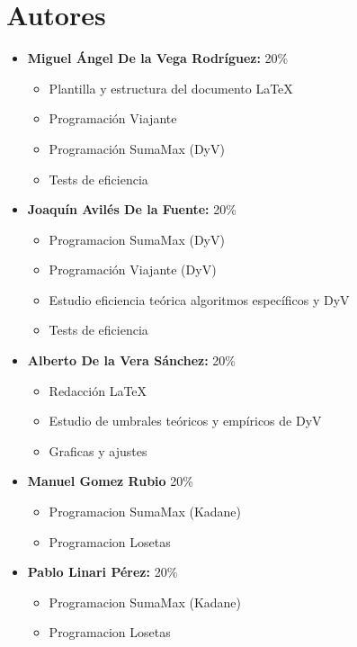 \documentclass[11pt,openany]{book}
\begin{document}
\tableofcontents %
\newpage %


\chapter{Autores}
\begin{itemize}
      \item \textbf{Miguel Ángel De la Vega Rodríguez:} 20\%
            \begin{itemize}
                  \item Plantilla y estructura del documento \LaTeX
                  \item Programación Viajante
                  \item Programación SumaMax (DyV)
                  \item Tests de eficiencia
            \end{itemize}
      \item \textbf{Joaquín Avilés De la Fuente:} 20\%
            \begin{itemize}
                  \item Programacion SumaMax (DyV)
                  \item Programación Viajante (DyV)
                  \item Estudio eficiencia teórica algoritmos específicos y DyV
                  \item Tests de eficiencia
            \end{itemize}
      \item \textbf{Alberto De la Vera Sánchez: } 20\%
            \begin{itemize}
                  \item Redacción \LaTeX
                  \item Estudio de umbrales teóricos y empíricos de DyV
                  \item Graficas y ajustes
            \end{itemize}
      \item \textbf{Manuel Gomez Rubio} 20\%
            \begin{itemize}
                  \item Programacion SumaMax (Kadane)
                  \item Programacion Losetas
            \end{itemize}
      \item \textbf{Pablo Linari Pérez:} 20\%
            \begin{itemize}
                  \item Programacion SumaMax (Kadane)
                  \item Programacion Losetas
            \end{itemize}
\end{itemize}
\end{document}

